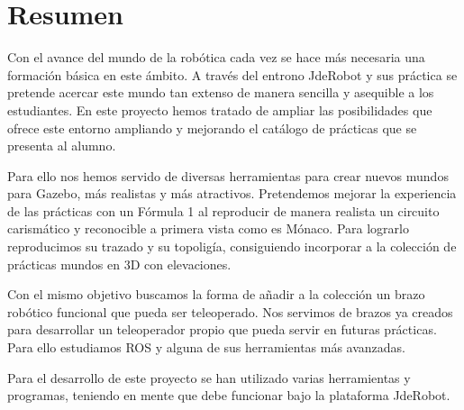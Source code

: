\chapter*{Resumen} %


Con el avance del mundo de la robótica cada vez se hace más necesaria una formación básica en este ámbito. A través del entrono JdeRobot y sus práctica se pretende acercar este mundo tan extenso de manera sencilla y asequible a los estudiantes. En este proyecto hemos tratado de ampliar las posibilidades que ofrece este entorno ampliando y mejorando el catálogo de prácticas que se presenta al alumno.

Para ello nos hemos servido de diversas herramientas para crear nuevos mundos para Gazebo, más realistas y más atractivos. Pretendemos mejorar la experiencia de las prácticas con un Fórmula 1 al reproducir de manera realista un circuito carismático y reconocible a primera vista como es Mónaco. Para lograrlo reproducimos su trazado y su topoligía, consiguiendo incorporar a la colección de prácticas mundos en 3D con elevaciones.

Con el mismo objetivo buscamos la forma de añadir a la colección un brazo robótico funcional que pueda ser teleoperado. Nos servimos de brazos ya creados para desarrollar un teleoperador propio que pueda servir en futuras prácticas. Para ello estudiamos ROS y alguna de sus herramientas más avanzadas.

Para el desarrollo de este proyecto se han utilizado varias herramientas y programas, teniendo en mente que debe funcionar bajo la plataforma JdeRobot.
